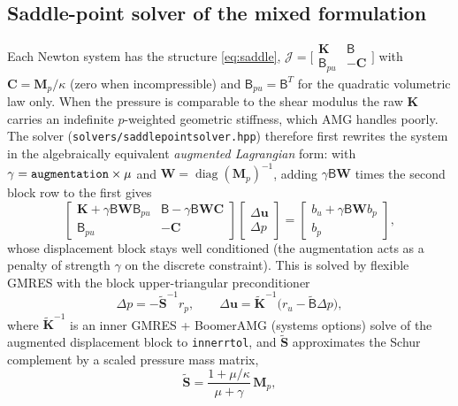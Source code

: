 \documentclass[11pt]{article}
\newcommand{\diag}{\operatorname{diag}}
\newcommand{\bu}{\bm{u}}
\newcommand{\bS}{\bm{S}}
\newcommand{\bC}{\bm{C}}
\newcommand{\bK}{\bm{K}}
\newcommand{\bM}{\bm{M}}
\newcommand{\bBm}{\bm{\mathsf{B}}}
\DeclareRobustCommand{\code}[1]{{\def\_{\textunderscore\allowbreak}\texttt{#1}}}
\DeclareRobustCommand{\file}[1]{{\def\_{\textunderscore\allowbreak}\texttt{#1}}}
\begin{document}
\subsection{Saddle-point solver of the mixed formulation}
\label{sec:saddlesolver}

Each Newton system has the structure \eqref{eq:saddle},
$\mathcal J = \bigl[\begin{smallmatrix}\bK & \bBm\\ \bBm_{pu} & -\bC\end{smallmatrix}\bigr]$
with $\bC = \bM_p/\kappa$ (zero when incompressible) and
$\bBm_{pu} = \bBm^T$ for the quadratic volumetric law only.  When the pressure is
comparable to the shear modulus the raw $\bK$ carries an indefinite
$p$-weighted geometric stiffness, which AMG handles poorly.  The solver
(\file{solvers/saddle\_point\_solver.hpp}) therefore first rewrites the
system in the algebraically equivalent \emph{augmented Lagrangian} form:
with $\gamma = \code{augmentation}\times\mu$ and
$\bm W = \diag(\bM_p)^{-1}$, adding $\gamma\bBm\bm W$ times the second block
row to the first gives
\begin{equation}
  \begin{bmatrix} \bK + \gamma\bBm\bm W\bBm_{pu} & \bBm - \gamma\bBm\bm W\bC \\ \bBm_{pu} & -\bC \end{bmatrix}
  \begin{bmatrix} \Delta\bu \\ \Delta p \end{bmatrix}
  = \begin{bmatrix} b_u + \gamma\bBm\bm W b_p \\ b_p \end{bmatrix},
  \label{eq:augmented}
\end{equation}
whose displacement block stays well conditioned (the augmentation acts as
a penalty of strength $\gamma$ on the discrete constraint).  This is solved
by flexible GMRES with the block upper-triangular preconditioner
\begin{equation}
  \Delta p = -\tilde{\bS}^{-1} r_p, \qquad
  \Delta\bu = \tilde{\bK}^{-1}\bigl(r_u - \tilde{\bBm}\Delta p\bigr),
\end{equation}
where $\tilde{\bK}^{-1}$ is an inner GMRES + BoomerAMG (systems options)
solve of the augmented displacement block to \code{inner\_rtol}, and
$\tilde{\bS}$ approximates the Schur complement by a scaled pressure mass
matrix,
\begin{equation}
  \tilde{\bS} = \frac{1 + \mu/\kappa}{\mu + \gamma}\,\bM_p ,
\end{equation}
\end{document}
